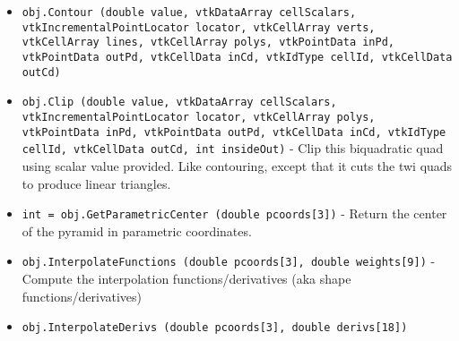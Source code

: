 \begin{itemize}
\item  \verb|obj.Contour (double value, vtkDataArray cellScalars, vtkIncrementalPointLocator locator, vtkCellArray verts, vtkCellArray lines, vtkCellArray polys, vtkPointData inPd, vtkPointData outPd, vtkCellData inCd, vtkIdType cellId, vtkCellData outCd)|

\item  \verb|obj.Clip (double value, vtkDataArray cellScalars, vtkIncrementalPointLocator locator, vtkCellArray polys, vtkPointData inPd, vtkPointData outPd, vtkCellData inCd, vtkIdType cellId, vtkCellData outCd, int insideOut)| -  Clip this biquadratic quad using scalar value provided. Like contouring,
 except that it cuts the twi quads to produce linear triangles.

\item  \verb|int = obj.GetParametricCenter (double pcoords[3])| -  Return the center of the pyramid in parametric coordinates.

\item  \verb|obj.InterpolateFunctions (double pcoords[3], double weights[9])| -  Compute the interpolation functions/derivatives
 (aka shape functions/derivatives)

\item  \verb|obj.InterpolateDerivs (double pcoords[3], double derivs[18])|

\end{itemize}
